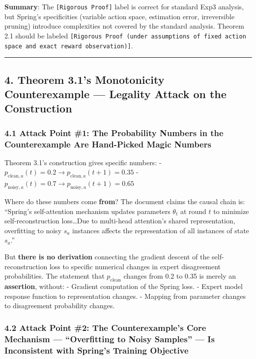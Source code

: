\documentclass[
  12pt,
]{article}
\begin{document}
\textbf{Summary}: The \texttt{[Rigorous Proof]} label is correct for standard Exp3 analysis, but Spring's specificities (variable action space, estimation error, irreversible pruning) introduce complexities not covered by the standard analysis. Theorem 2.1 should be labeled \texttt{[Rigorous Proof (under assumptions of fixed action space and exact reward observation)]}.

\begin{center}\rule{0.5\linewidth}{0.5pt}\end{center}

\subsection{4. Theorem 3.1's Monotonicity Counterexample --- Legality Attack on the Construction}\label{attack-thm-3.1}

\subsubsection{4.1 Attack Point \#1: The Probability Numbers in the Counterexample Are Hand-Picked Magic Numbers}\label{attack-1-magic-numbers}

Theorem 3.1's construction gives specific numbers:
- $p_{\text{clean},a}(t) = 0.2 \to p_{\text{clean},a}(t+1) = 0.35$
- $p_{\text{noisy},a}(t) = 0.7 \to p_{\text{noisy},a}(t+1) = 0.65$

Where do these numbers come \textbf{from}? The document claims the causal chain is: ``Spring's self-attention mechanism updates parameters $\theta_t$ at round $t$ to minimize self-reconstruction loss\ldots Due to multi-head attention's shared representation, overfitting to noisy $s_a$ instances affects the representation of all instances of state $s_a$.''

But \textbf{there is no derivation} connecting the gradient descent of the self-reconstruction loss to specific numerical changes in expert disagreement probabilities. The statement that $p_{\text{clean}}$ changes from 0.2 to 0.35 is merely an \textbf{assertion}, without:
- Gradient computation of the Spring loss.
- Expert model response function to representation changes.
- Mapping from parameter changes to disagreement probability changes.

\subsubsection{4.2 Attack Point \#2: The Counterexample's Core Mechanism --- ``Overfitting to Noisy Samples'' --- Is Inconsistent with Spring's Training Objective}\label{attack-2-overfitting-mechanism}
\end{document}
